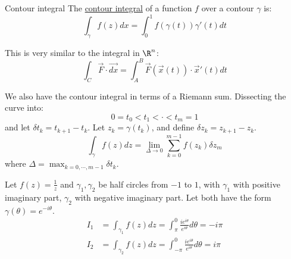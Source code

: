 \documentclass[../Main.tex]{subfiles}
\begin{document}
\begin{definition}{Contour integral}
    The \underline{contour integral} of a function $f$ over a contour $\gamma$ is:
    \begin{equation*}
        \int_{\gamma} f(z) dx = \int_0^1 f(\gamma(t)) \gamma'(t) dt
    \end{equation*}
\end{definition}
\begin{remark}
    This is very similar to the integral in $\R^n$:
    \begin{equation*}
        \int_{C} \vec{F} \cdot \vec{dx} = \int_{A}^{B} \vec{F}(\vec{x}(t)) \cdot \vec{x}'(t) dt
    \end{equation*}
\end{remark}
We also have the contour integral in terms of a Riemann sum. Dissecting the curve into:
\begin{equation*}
    0 = t_0 < t_1 < \cdot < t_m = 1
\end{equation*}
and let $\delta t_k = t_{k+1} - t_k$. Let $z_k = \gamma(t_k)$, and define $\delta z_k = z_{k+1} - z_k$.
\begin{equation*}
    \int_\gamma f(z) dz = \lim_{\Delta \to 0} \sum_{k=0}^{m-1} f(z_k) \delta z_m
\end{equation*}
where $\Delta = \max_{k = 0, \cdots, m-1} \delta t_k$.
\begin{example}
    Let $f(z) = \frac1z$ and $\gamma_1, \gamma_2$ be half circles from $-1$ to $1$, with $\gamma_1$ with positive imaginary part, $\gamma_2$ with negative imaginary part. Let both have the form $\gamma(\theta) = e^{-i\theta}$.
    \begin{align*}
        I_1 &= \int_{\gamma_1} f(z) dz = \int_{\pi}^0 \frac{ie^{i\theta}}{e^{i\theta}} d\theta = -i\pi \\
        I_2 &= \int_{\gamma_2} f(z) dz = \int_{-\pi}^0 \frac{ie^{i\theta}}{e^{i\theta}} d\theta = i\pi \\
    \end{align*}
\end{example}
\end{document}

